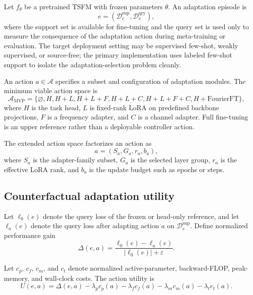 \documentclass[10pt]{article}
\newcommand{\D}{\mathcal{D}}
\newcommand{\Acal}{\mathcal{A}}
\newcommand{\eps}{\varepsilon}
\begin{document}
Let $f_{\theta}$ be a pretrained TSFM with frozen parameters $\theta$. An adaptation episode is
\begin{equation}
 e = (\D_e^{\mathrm{sup}},\D_e^{\mathrm{qry}}),
\end{equation}
where the support set is available for fine-tuning and the query set is used only to measure the consequence of the adaptation action during meta-training or evaluation. The target deployment setting may be supervised few-shot, weakly supervised, or source-free; the primary implementation uses labeled few-shot support to isolate the adaptation-selection problem cleanly.

An action $a\in\Acal$ specifies a subset and configuration of adaptation modules. The minimum viable action space is
\begin{equation}
\Acal_{\mathrm{MVP}}=
\{\varnothing,H,H{+}L,H{+}L{+}F,H{+}L{+}C,H{+}L{+}F{+}C,H{+}\mathrm{FourierFT}\},
\end{equation}
where $H$ is the task head, $L$ is fixed-rank LoRA on predefined backbone projections, $F$ is a frequency adapter, and $C$ is a channel adapter. Full fine-tuning is an upper reference rather than a deployable controller action.

The extended action space factorizes an action as
\begin{equation}
 a=(S_a,G_a,r_a,b_a),
\end{equation}
where $S_a$ is the adapter-family subset, $G_a$ is the selected layer group, $r_a$ is the effective LoRA rank, and $b_a$ is the update budget such as epochs or steps.

\subsection{Counterfactual adaptation utility}

Let $\ell_0(e)$ denote the query loss of the frozen or head-only reference, and let $\ell_a(e)$ denote the query loss after adapting action $a$ on $\D_e^{\mathrm{sup}}$. Define normalized performance gain
\begin{equation}
\Delta(e,a)=\frac{\ell_0(e)-\ell_a(e)}{|\ell_0(e)|+\eps}.
\end{equation}

Let $c_p$, $c_f$, $c_m$, and $c_t$ denote normalized active-parameter, backward-FLOP, peak-memory, and wall-clock costs. The action utility is
\begin{equation}
U(e,a)=\Delta(e,a)
-\lambda_p c_p(a)
-\lambda_f c_f(a)
-\lambda_m c_m(a)
-\lambda_t c_t(a).
\label{eq:utility}
\end{equation}
\end{document}
